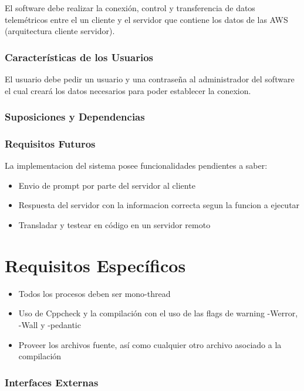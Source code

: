 \documentclass[10pt, a4paper,notitlepage]{article}
\begin{document}
El software debe realizar la conexión, control y transferencia de datos telemétricos entre el un cliente y el servidor que contiene los
datos de las AWS (arquitectura cliente servidor).
\subsubsection{Características de los Usuarios }
El usuario debe pedir un usuario y una contraseña al administrador del software el cual creará los datos necesarios para poder establecer la conexion.

\subsubsection{Suposiciones y Dependencias}

\subsubsection{Requisitos Futuros}
La implementacion del sistema posee funcionalidades pendientes a saber:
\begin{itemize}
	\item Envio de prompt por parte del servidor al cliente 
	\item Respuesta del servidor con la informacion correcta segun la funcion a ejecutar
	\item Transladar y testear en código en un servidor remoto 
	
\end{itemize}
\section{Requisitos Específicos}
\begin{itemize}
	\item Todos los procesos deben ser mono-thread
	\item Uso de Cppcheck y la compilación con el uso de las flags de warning -Werror, -Wall y -pedantic
	\item Proveer los archivos fuente, así como cualquier otro archivo asociado
	a la compilación
	
\end{itemize}

\subsubsection{Interfaces Externas}
\end{document}
